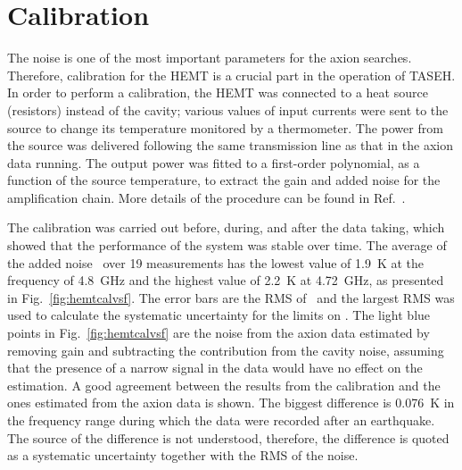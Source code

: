 \section{Calibration} \label{sec:hemtcalibration}
\label{sec:calibration}

The noise is one of the most important 
parameters for the axion searches. Therefore, calibration for the HEMT is a 
crucial part in the operation of TASEH. In order to perform a calibration, 
the HEMT was connected to a heat source (resistors) instead of the cavity; 
various values of input currents were sent to the source to change its 
temperature monitored by a thermometer. The power from the source 
was delivered following the same transmission line as that in the axion 
data running. 
The output power was fitted to a first-order polynomial, as a function of the source temperature, 
to extract the gain and added noise for the amplification chain. More details of the 
procedure can be found in Ref.~\cite{TASEHInstrumentation}. 

The calibration was carried out before, 
during, and after the data taking, which showed that the performance of the system
was stable over time. The average of the added noise \ta\ over 19 measurements 
has the lowest value of 1.9~K at the frequency of 4.8~GHz and the highest value of 
2.2~K at 4.72~GHz, as presented in Fig.~\ref{fig:hemtcalvsf}. 
The error bars are the RMS of \ta\ and the largest RMS was used to calculate 
the systematic uncertainty for the limits on \gagg. The light blue points in 
Fig.~\ref{fig:hemtcalvsf} are the noise from the axion data estimated by 
removing gain and subtracting the contribution from the cavity noise, assuming 
that the presence of a narrow signal in the data would have no effect on the 
estimation. A good agreement between the results from the calibration  
and the ones estimated from the axion data is shown. The biggest 
difference is 0.076~K in the frequency range during which the data were 
recorded after an earthquake. The source of the difference is not understood, 
therefore, the difference is quoted as a systematic uncertainty together 
with the RMS of the noise.

